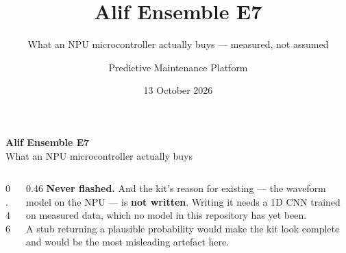 \documentclass[aspectratio=169,10pt]{beamer}
\title[Alif E7 node]{Alif Ensemble E7}
\subtitle{What an NPU microcontroller actually buys --- measured, not assumed}
\author{Predictive Maintenance Platform}
\date{13 October 2026}
\begin{document}
\begin{frame}[plain]
  \vspace{5mm}
  {\LARGE\bfseries Alif Ensemble E7}\\[2mm]
  {\large\color{pdmink2} What an NPU microcontroller actually buys}\par
  \vspace{5mm}\noindent{\color{pdmrule}\rule{\linewidth}{0.4pt}}\par
  \vspace{3mm}
  \begin{columns}[T]
    \begin{column}{0.46\textwidth}
      \scriptsize
      \\[1mm]
      \\[1mm]
      \\[1mm]
      \\[1mm]
      \\[1mm]
    \end{column}
    \begin{column}{0.46\textwidth}
      \scriptsize\color{pdmink2}
      \textbf{Never flashed.} And the kit's reason for existing --- the waveform
      model on the NPU --- is \textbf{not written}. Writing it needs a 1D CNN
      trained on measured data, which no model in this repository has yet been.
      \\[2mm]
      A stub returning a plausible probability would make the kit look complete
      and would be the most misleading artefact here.
    \end{column}
  \end{columns}
\end{frame}
\end{document}
